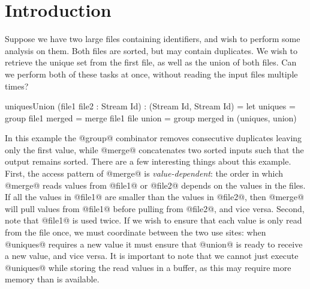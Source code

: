 \section{Introduction}
\label{s:Introduction}


Suppose we have two large files containing identifiers, and wish to perform some analysis on them.
Both files are sorted, but may contain duplicates.
We wish to retrieve the unique set from the first file, as well as the union of both files.
Can we perform both of these tasks at once, without reading the input files multiple times?

\begin{code}
uniquesUnion (file1 file2 : Stream Id) : (Stream Id, Stream Id)
 = let uniques = group file1
       merged  = merge file1 file
       union   = group merged
   in (uniques, union)
\end{code}

In this example the @group@ combinator removes consecutive duplicates leaving only the first value, while @merge@ concatenates two sorted inputs such that the output remains sorted.
There are a few interesting things about this example.
First, the access pattern of @merge@ is \emph{value-dependent}: the order in which @merge@ reads values from @file1@ or @file2@ depends on the values in the files.
If all the values in @file1@ are smaller than the values in @file2@, then @merge@ will pull values from @file1@ before pulling from @file2@, and vice versa.
Second, note that @file1@ is used twice.
If we wish to ensure that each value is only read from the file once, we must coordinate between the two use sites: when @uniques@ requires a new value it must ensure that @union@ is ready to receive a new value, and vice versa.
It is important to note that we cannot just execute @uniques@ while storing the read values in a buffer, as this may require more memory than is available.

